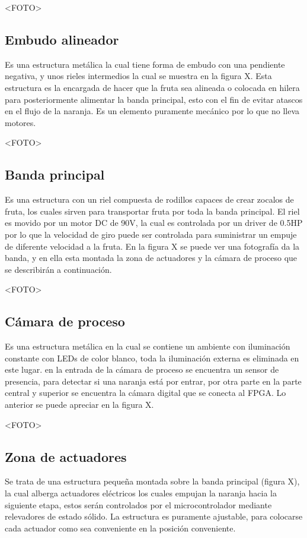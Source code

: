 \documentclass[twoside,spanish,ESP,MSc]{plantillaLabUPV}
\theoremstyle{definition}
\begin{document}
<FOTO>

\subsection{Embudo alineador}
Es una estructura metálica la cual tiene forma de embudo con una pendiente negativa, y unos rieles intermedios la cual se muestra en la figura X. Esta estructura es la encargada de hacer que la fruta sea alineada o colocada en hilera para posteriormente alimentar la banda principal, esto con el fin de evitar atascos en el flujo de la naranja. Es un elemento puramente mecánico por lo que no lleva motores.


<FOTO>

\subsection{Banda principal}
Es una estructura con un riel compuesta de rodillos capaces de crear zocalos de fruta, los cuales sirven para transportar fruta por toda la banda principal. El riel es movido por un motor DC de 90V, la cual es controlada por un driver de 0.5HP por lo que la velocidad de giro puede ser controlada para suministrar un empuje de diferente velocidad a la fruta. En la figura X se puede ver una fotografía da la banda, y en ella esta montada la zona de actuadores y la cámara de proceso que se describirán a continuación.


<FOTO>

\subsection{Cámara de proceso}
Es una estructura metálica en la cual se contiene un ambiente con iluminación constante con LEDs de color blanco, toda la iluminación externa es eliminada en este lugar. en la entrada de la cámara de proceso se encuentra un sensor de presencia, para detectar si una naranja está por entrar, por otra parte en la parte central y superior se encuentra la cámara digital que se conecta al FPGA. Lo anterior se puede apreciar en la figura X.


<FOTO>

\subsection{Zona de actuadores}
Se trata de una estructura pequeña montada sobre la banda principal (figura X), la cual alberga actuadores eléctricos los cuales empujan la naranja hacia la siguiente etapa, estos serán controlados por el microcontrolador mediante relevadores de estado sólido. La estructura es puramente ajustable, para colocarse cada actuador como sea conveniente en la posición conveniente.
\end{document}
